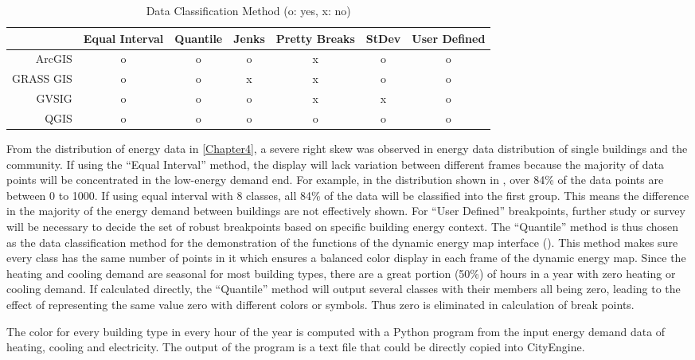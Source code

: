 \begin{table}[h!]
  \centering
  \begin{tabular}{r|c c c c c c}
    \hline
           & Equal Interval & Quantile & Jenks & Pretty Breaks & StDev & User Defined\\
    \hline
    ArcGIS &      o        &    o     &  o    & x &  o  &   o  \\
 GRASS GIS &      o        &    o     &  x    & x &  o  &   o  \\
     GVSIG &      o        &    o     &  o    & x &  x  &   o  \\
      QGIS &      o        &    o     &  o    & o &  o  &   o  \\
    \hline
  \end{tabular}
  \caption{Data Classification Method (o: yes, x: no)}
  \label{tab:classify}
\end{table}

From the distribution of energy data in \cref{Chapter4}, a severe
right skew was observed in energy data distribution of single
buildings and the community. If using the ``Equal Interval'' method,
the display will lack variation between different frames because the
majority of data points will be concentrated in the low-energy demand
end. For example, in the distribution shown in
, over 84\% of the data points are
between 0 to 1000. If using equal interval with 8 classes, all 84\% of
the data will be classified into the first group. This means the
difference in the majority of the energy demand between buildings are
not effectively shown. For ``User Defined'' breakpoints, further study
or survey will be necessary to decide the set of robust breakpoints
based on specific building energy context. The ``Quantile'' method is
thus chosen as the data classification method for the demonstration of
the functions of the dynamic energy map interface
(). This method makes sure every class has the same
number of points in it which ensures a balanced color display in each
frame of the dynamic energy map. Since the heating and cooling demand
are seasonal for most building types, there are a great portion (50\%)
of hours in a year with zero heating or cooling demand. If calculated
directly, the ``Quantile'' method will output several classes with
their members all being zero, leading to the effect of representing
the same value zero with different colors or symbols. Thus zero is
eliminated in calculation of break points.

The color for every building type in every hour of the year is
computed with a Python program from the input energy demand data of
heating, cooling and electricity. The output of the program is a text
file that could be directly copied into CityEngine.

